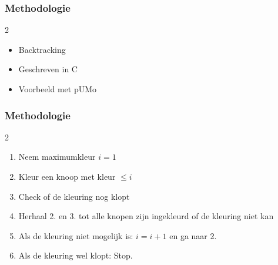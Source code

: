 \documentclass
[kulak] %
{kulakbeamer}
\newenvironment{restrictedframe}
{\begin{frame}}
	{\end{frame} \addtocounter{framenumber}{-1}}
\begin{document}
	\begin{frame}
		\frametitle{Methodologie}
		
		
		\begin{multicols}{2}
			\begin{itemize}
				\item Backtracking
				\item Geschreven in C\pause
				\item Voorbeeld met pUMo
			\end{itemize}
			\vspace{\fill}\null
			\begin{center}
				\scalebox{1.4}{}
			\end{center}
			
		\end{multicols}
%							

		
	\end{frame}
	
	\begin{restrictedframe}
		\frametitle{Methodologie}
		\begin{multicols}{2}
			\begin{enumerate}
				\item Neem maximumkleur $i = 1$
				\item Kleur een knoop met kleur $\le i$
				\item Check of de kleuring nog klopt
				\item Herhaal 2. en 3. tot alle knopen zijn ingekleurd of de kleuring niet kan
				\item Als de kleuring niet mogelijk is: $i = i + 1$ en ga naar 2.
				\item Als de kleuring wel klopt: Stop.
				
			\end{enumerate}
			
			\begin{center}
				\scalebox{1.4}{}
			\end{center}
			
		\end{multicols}

	\end{restrictedframe}
	
\end{document}

